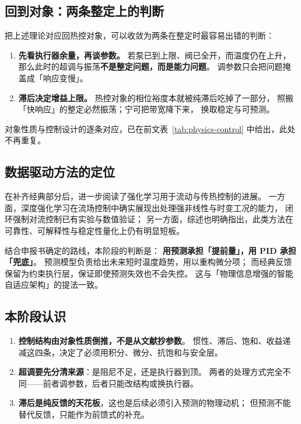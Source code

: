 \documentclass[stage1,fontset=fandol]{ydzjreport}
\begin{document}
	\subsection{回到对象：两条整定上的判断}
	
	把上述理论对应回热控对象，可以收敛为两条在整定时最容易出错的判断：
	
	\begin{enumerate}
		\item \textbf{先看执行器余量，再谈参数。}
		若泵已到上限、阀已全开，而温度仍在上升，
		那么此时的超调与振荡\textbf{不是整定问题，而是能力问题}。
		调参数只会把问题掩盖成「响应变慢」。
		\item \textbf{滞后决定增益上限。}
		热控对象的相位裕度本就被纯滞后吃掉了一部分，
		照搬「快响应」的整定必然振荡；宁可把带宽降下来，
		换取稳定与可预测。
	\end{enumerate}
	
	对象性质与控制设计的逐条对应，已在前文表~\ref{tab:physics-control} 中给出，此处不再重复。
	
	\subsection{数据驱动方法的定位}
	
	在补齐经典部分后，进一步阅读了强化学习用于流动与传热控制的进展。
	一方面，深度强化学习在流场控制中确实展现出处理强非线性与时变工况的能力，
	闭环强制对流控制已有实验与数值验证\cite{wangy,wangyz}；
	另一方面，综述也明确指出，此类方法在可靠性、可解释性与稳定性量化上仍有明显短板\cite{vignon}。
	
	结合申报书确定的路线，本阶段的判断是：
	\textbf{用预测承担「提前量」，用 PID 承担「兜底」}。
	预测模型负责给出未来短时温度趋势，用以重构微分项；
	而经典反馈保留为约束执行层，保证即使预测失效也不会失控。
	这与「物理信息增强的智能自适应架构」的提法一致\cite{tao,brunton}。
	
	\subsection{本阶段认识}
	
	\begin{enumerate}
		\item \textbf{控制结构由对象性质倒推，不是从文献抄参数}。
		惯性、滞后、饱和、收益递减这四条，决定了必须用积分、微分、抗饱和与安全层。
		\item \textbf{超调要先分清来源}：是阻尼不足，还是执行器到顶。
		两者的处理方式完全不同——前者调参数，后者只能改结构或换执行器。
		\item \textbf{滞后是纯反馈的天花板}，这也是后续必须引入预测的物理动机；
		但预测不能替代反馈，只能作为前馈式的补充。
	\end{enumerate}
	
\end{document}
